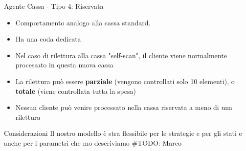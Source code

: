 \begin{frame}{Agente Cassa - Tipo 4: Riservata}
	
	\begin{itemize}
		\item Comportamento analogo alla cassa standard.
		\item Ha una coda dedicata
		\item Nel caso di rilettura alla cassa "self-scan", il cliente viene normalmente processato in questa nuova cassa
		\item La rilettura può essere \textbf{parziale} (vengono controllati solo 10 elementi), o \textbf{totale} (viene controllata tutta la spesa)
		\item Nessun cliente può venire processato nella cassa riservata a meno di una rilettura
	\end{itemize}
\end{frame}




\begin{frame}{Considerazioni}
	\centering
	Il nostro modello è stra flessibile per le strategie e per gli stati e anche per i parametri che mo descriviamo
	\#TODO: Marco
\end{frame}




